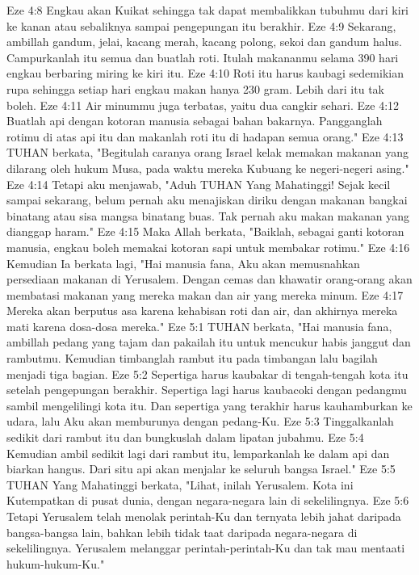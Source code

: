 Eze 4:8  Engkau akan Kuikat sehingga tak dapat membalikkan tubuhmu dari kiri ke kanan atau sebaliknya sampai pengepungan itu berakhir.
Eze 4:9  Sekarang, ambillah gandum, jelai, kacang merah, kacang polong, sekoi dan gandum halus. Campurkanlah itu semua dan buatlah roti. Itulah makananmu selama 390 hari engkau berbaring miring ke kiri itu.
Eze 4:10  Roti itu harus kaubagi sedemikian rupa sehingga setiap hari engkau makan hanya 230 gram. Lebih dari itu tak boleh.
Eze 4:11  Air minummu juga terbatas, yaitu dua cangkir sehari.
Eze 4:12  Buatlah api dengan kotoran manusia sebagai bahan bakarnya. Pangganglah rotimu di atas api itu dan makanlah roti itu di hadapan semua orang."
Eze 4:13  TUHAN berkata, "Begitulah caranya orang Israel kelak memakan makanan yang dilarang oleh hukum Musa, pada waktu mereka Kubuang ke negeri-negeri asing."
Eze 4:14  Tetapi aku menjawab, "Aduh TUHAN Yang Mahatinggi! Sejak kecil sampai sekarang, belum pernah aku menajiskan diriku dengan makanan bangkai binatang atau sisa mangsa binatang buas. Tak pernah aku makan makanan yang dianggap haram."
Eze 4:15  Maka Allah berkata, "Baiklah, sebagai ganti kotoran manusia, engkau boleh memakai kotoran sapi untuk membakar rotimu."
Eze 4:16  Kemudian Ia berkata lagi, "Hai manusia fana, Aku akan memusnahkan persediaan makanan di Yerusalem. Dengan cemas dan khawatir orang-orang akan membatasi makanan yang mereka makan dan air yang mereka minum.
Eze 4:17  Mereka akan berputus asa karena kehabisan roti dan air, dan akhirnya mereka mati karena dosa-dosa mereka."
Eze 5:1  TUHAN berkata, "Hai manusia fana, ambillah pedang yang tajam dan pakailah itu untuk mencukur habis janggut dan rambutmu. Kemudian timbanglah rambut itu pada timbangan lalu bagilah menjadi tiga bagian.
Eze 5:2  Sepertiga harus kaubakar di tengah-tengah kota itu setelah pengepungan berakhir. Sepertiga lagi harus kaubacoki dengan pedangmu sambil mengelilingi kota itu. Dan sepertiga yang terakhir harus kauhamburkan ke udara, lalu Aku akan memburunya dengan pedang-Ku.
Eze 5:3  Tinggalkanlah sedikit dari rambut itu dan bungkuslah dalam lipatan jubahmu.
Eze 5:4  Kemudian ambil sedikit lagi dari rambut itu, lemparkanlah ke dalam api dan biarkan hangus. Dari situ api akan menjalar ke seluruh bangsa Israel."
Eze 5:5  TUHAN Yang Mahatinggi berkata, "Lihat, inilah Yerusalem. Kota ini Kutempatkan di pusat dunia, dengan negara-negara lain di sekelilingnya.
Eze 5:6  Tetapi Yerusalem telah menolak perintah-Ku dan ternyata lebih jahat daripada bangsa-bangsa lain, bahkan lebih tidak taat daripada negara-negara di sekelilingnya. Yerusalem melanggar perintah-perintah-Ku dan tak mau mentaati hukum-hukum-Ku."
